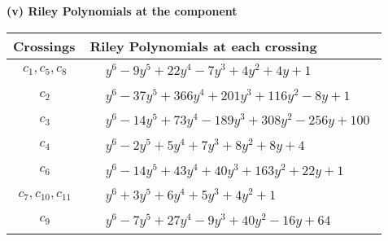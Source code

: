 \documentclass[1p]{elsarticle_modified}
\theoremstyle{definition}
\begin{document}
\newpage\renewcommand{\arraystretch}{1}
\flushleft \textbf{(v) Riley Polynomials at the component}\newline \\
\begin{tabular}{m{50pt}|m{274pt}}
Crossings & \hspace{64pt}Riley Polynomials at each crossing \\
\hline $$\begin{aligned}c_{1},c_{5},c_{8}\end{aligned}$$&$\begin{aligned}
&y^6-9 y^5+22 y^4-7 y^3+4 y^2+4 y+1
\end{aligned}$\\
\hline $$\begin{aligned}c_{2}\end{aligned}$$&$\begin{aligned}
&y^6-37 y^5+366 y^4+201 y^3+116 y^2-8 y+1
\end{aligned}$\\
\hline $$\begin{aligned}c_{3}\end{aligned}$$&$\begin{aligned}
&y^6-14 y^5+73 y^4-189 y^3+308 y^2-256 y+100
\end{aligned}$\\
\hline $$\begin{aligned}c_{4}\end{aligned}$$&$\begin{aligned}
&y^6-2 y^5+5 y^4+7 y^3+8 y^2+8 y+4
\end{aligned}$\\
\hline $$\begin{aligned}c_{6}\end{aligned}$$&$\begin{aligned}
&y^6-14 y^5+43 y^4+40 y^3+163 y^2+22 y+1
\end{aligned}$\\
\hline $$\begin{aligned}c_{7},c_{10},c_{11}\end{aligned}$$&$\begin{aligned}
&y^6+3 y^5+6 y^4+5 y^3+4 y^2+1
\end{aligned}$\\
\hline $$\begin{aligned}c_{9}\end{aligned}$$&$\begin{aligned}
&y^6-7 y^5+27 y^4-9 y^3+40 y^2-16 y+64
\end{aligned}$\\
\hline
\end{tabular}\\~\\
\end{document}
